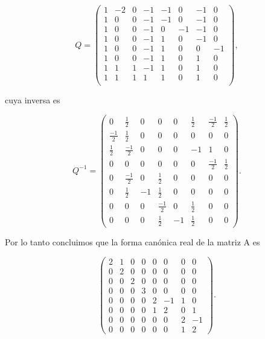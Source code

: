 \documentclass[letterpaper]{article}
\theoremstyle{definition}
\theoremstyle{lemathm}
\theoremstyle{lemademthm}
\newcommand{\pars}[1]{\left( #1 \right) }
\newcommand{\1}{\mathbbm{1}}
\begin{document}
\begin{enumerate}
		\[Q = \pars{\begin{array}{cccccccc}
				1 & -2 & 0 & -1 & -1 &  0 & -1 &  0\\[1ex]
				1 &  0 & 0 & -1 & -1 &  0 & -1 &  0\\[1ex]
				1 &  0 & 0 & -1 &  0 & -1 & -1 &  0\\[1ex]
				1 &  0 & 0 & -1 &  1 &  0 & -1 &  0\\[1ex]
				1 &  0 & 0 & -1 &  1 &  0 &  0 & -1\\[1ex]
				1 &  0 & 0 & -1 &  1 &  0 &  1 &  0\\[1ex]
				1 &  1 & 1 & -1 &  1 &  0 &  1 &  0\\[1ex]
				1 &  1 & 1 &  1 &  1 &  0 &  1 &  0\\
		\end{array}},\]

		cuya inversa es

		\[Q^{-1} = \pars{\begin{array}{cccccccc}
			0 & \frac{1}{2} & 0 & 0 & 0 & \frac{1}{2} & \frac{-1}{2} & \frac{1}{2} \\[1ex]
			\frac{-1}{2} & \frac{1}{2} & 0 & 0 & 0 & 0 & 0 & 0 \\[1ex]
			\frac{1}{2} & \frac{-1}{2} & 0 & 0 & 0 & -1 & 1 & 0 \\[1ex]
			0 & 0 & 0 & 0 & 0 & 0 & \frac{-1}{2} & \frac{1}{2} \\[1ex]
			0 & \frac{-1}{2} & 0 & \frac{1}{2} & 0 & 0 & 0 & 0 \\[1ex]
			0 & \frac{1}{2} & -1 & \frac{1}{2} & 0 & 0 & 0 & 0 \\[1ex]
			0 & 0 & 0 & \frac{-1}{2} & 0 & \frac{1}{2} & 0 & 0 \\[1ex]
			0 & 0 & 0 & \frac{1}{2} & -1 & \frac{1}{2} & 0 & 0
		\end{array}}.\]

		Por lo tanto concluimos que la forma canónica real de la matriz A es

		\[\pars{\begin{array}{cccccccc}
			2 & 1 & 0 & 0 & 0 & 0 & 0 & 0 \\[1ex]
			0 & 2 & 0 & 0 & 0 & 0 & 0 & 0 \\[1ex]
			0 & 0 & 2 & 0 & 0 & 0 & 0 & 0 \\[1ex]
			0 & 0 & 0 & 3 & 0 & 0 & 0 & 0 \\[1ex]
			0 & 0 & 0 & 0 & 2 & -1 & 1 & 0 \\[1ex]
			0 & 0 & 0 & 0 & 1 & 2 & 0 & 1 \\[1ex]
			0 & 0 & 0 & 0 & 0 & 0 & 2 & -1 \\[1ex]
			0 & 0 & 0 & 0 & 0 & 0 & 1 & 2
		\end{array}}.\]

	\end{enumerate}

	
\end{document}
